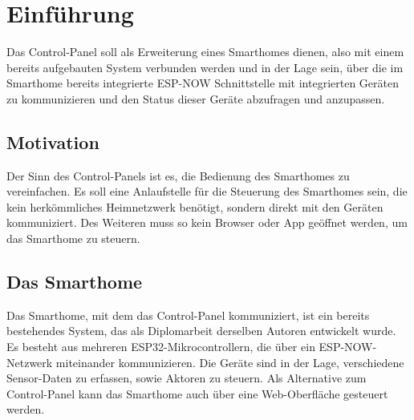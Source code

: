 \chapter{Einführung}

Das Control-Panel soll als Erweiterung eines Smarthomes dienen, also
mit einem bereits aufgebauten System verbunden werden und in der Lage sein, 
über die im Smarthome bereits integrierte ESP-NOW Schnittstelle mit 
integrierten Geräten zu kommunizieren und den Status dieser Geräte 
abzufragen und anzupassen.

    \section{Motivation}
    Der Sinn des Control-Panels ist es, die Bedienung des Smarthomes zu vereinfachen.
    Es soll eine Anlaufstelle für die Steuerung des Smarthomes sein, die kein
    herkömmliches Heimnetzwerk benötigt, sondern direkt mit den Geräten kommuniziert.
    Des Weiteren muss so kein Browser oder App geöffnet werden, um das Smarthome zu 
    steuern.

    \section{Das Smarthome}
    Das Smarthome, mit dem das Control-Panel kommuniziert, ist ein bereits 
    bestehendes System, das als Diplomarbeit derselben Autoren entwickelt wurde.
    Es besteht aus mehreren ESP32-Mikrocontrollern, die über ein ESP-NOW-Netzwerk
    miteinander kommunizieren. Die Geräte sind in der Lage, verschiedene 
    Sensor-Daten zu erfassen, sowie Aktoren zu steuern. Als Alternative zum
    Control-Panel kann das Smarthome auch über eine Web-Oberfläche gesteuert werden.


        
        
        
